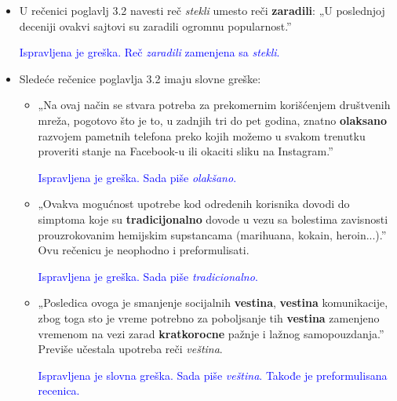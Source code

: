 \documentclass[a4paper]{report}
\newcommand{\odgovor}[1]{\textcolor{blue}{#1}}
\begin{document}
\begin{itemize}
    \item U rečenici poglavlj 3.2 navesti reč \textit{stekli} umesto reči \textbf{zaradili}: \newline
    „U poslednjoj deceniji ovakvi sajtovi su zaradili ogromnu popularnost.”
    
    \odgovor{Ispravljena je greška. Reč \textit{zaradili} zamenjena sa \textit{stekli}.}
    
\end{itemize}
\begin{itemize}
    \item Sledeće rečenice poglavlja 3.2 imaju slovne greške: \newline
    \begin{itemize}
        \item  „Na ovaj način se stvara potreba za prekomernim korišćenjem društvenih mreža, pogotovo što je to, u zadnjih tri do pet godina, znatno \textbf{olaksano} razvojem pametnih telefona preko kojih možemo u svakom trenutku proveriti stanje na Facebook-u ili okaciti sliku na Instagram.”
        
        \odgovor{Ispravljena je greška. Sada piše \textit{olakšano}.}
        
        
    \end{itemize}
    \begin{itemize}
        \item „Ovakva mogućnost upotrebe kod odredenih korisnika dovodi do simptoma koje su \textbf{tradicijonalno} dovode u vezu sa bolestima zavisnosti prouzrokovanim hemijskim supstancama (marihuana, kokain, heroin...).” \newline
        Ovu rečenicu je neophodno i preformulisati.
        
        \odgovor{Ispravljena je greška. Sada piše \textit{tradicionalno}.}
        
    \end{itemize}
    \begin{itemize}
        \item „Posledica ovoga je smanjenje socijalnih \textbf{vestina}, \textbf{vestina} komunikacije, zbog toga sto je vreme potrebno za poboljsanje tih \textbf{vestina} zamenjeno vremenom na vezi zarad \textbf{kratkorocne} pažnje i lažnog samopouzdanja.”\newline
        Previše učestala upotreba reči \textit{veština}.
        
        \odgovor{Ispravljena je slovna greška. Sada piše \textit{veština}. Takođe je preformulisana recenica.}
        

\end{itemize}
\end{itemize}
\end{document}
